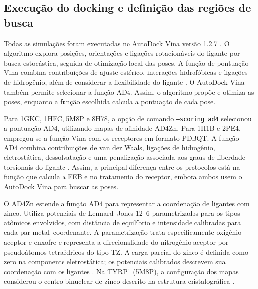 \subsection{Execução do docking e definição das regiões de busca}
Todas as simulações foram executadas no AutoDock Vina versão 1.2.7 \parencite{eberhardt2021vina}. O algoritmo explora posições, orientações e ligações rotacionáveis do ligante por busca estocástica, seguida de otimização local das poses. A função de pontuação Vina combina contribuições de ajuste estérico, interações hidrofóbicas e ligações de hidrogênio, além de considerar a flexibilidade do ligante \parencite{trott2010,eberhardt2021vina}. O AutoDock Vina também permite selecionar a função AD4. Assim, o algoritmo propõe e otimiza as poses, enquanto a função escolhida calcula a pontuação de cada pose.

Para 1GKC, 1HFC, 5M8P e 8H78, a opção de comando \texttt{--scoring ad4} selecionou a pontuação AD4, utilizando mapas de afinidade AD4Zn. Para 1H1B e 2PE4, empregou-se a função Vina com os receptores em formato PDBQT. A função AD4 combina contribuições de van der Waals, ligações de hidrogênio, eletrostática, dessolvatação e uma penalização associada aos graus de liberdade torsionais do ligante \parencite{morris2009autodock}. Assim, a principal diferença entre os protocolos está na função que calcula a FEB e no tratamento do receptor, embora ambos usem o AutoDock Vina para buscar as poses.

O AD4Zn estende a função AD4 para representar a coordenação de ligantes com zinco. Utiliza potenciais de Lennard--Jones 12--6 parametrizados para os tipos atômicos envolvidos, com distância de equilíbrio e intensidade calibradas para cada par metal--coordenante. A parametrização trata especificamente oxigênio aceptor e enxofre e representa a direcionalidade do nitrogênio aceptor por pseudoátomos tetraédricos do tipo TZ. A carga parcial do zinco é definida como zero na componente eletrostática; os potenciais calibrados descrevem sua coordenação com os ligantes \parencite{santos2014zn}. Na TYRP1 (5M8P), a configuração dos mapas considerou o centro binuclear de zinco descrito na estrutura cristalográfica \parencite{lai2017}.

